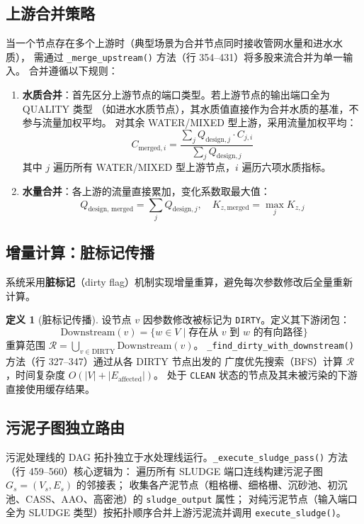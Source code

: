 \documentclass[12pt,a4paper]{ctexart}
\theoremstyle{definition}
\newtheorem{definition}{定义}[section]
\theoremstyle{remark}
\begin{document}
\subsection{上游合并策略}

当一个节点存在多个上游时（典型场景为合并节点同时接收管网水量和进水水质），
需通过 \texttt{\_merge\_upstream()} 方法（行 354--431）将多股来流合并为单一输入。
合并遵循以下规则：

\begin{enumerate}
  \item \textbf{水质合并}：首先区分上游节点的端口类型。若上游节点的输出端口全为 QUALITY 类型
        （如进水水质节点），其水质值直接作为合并水质的基准，不参与流量加权平均。
        对其余 WATER/MIXED 型上游，采用流量加权平均：
        \[
        C_{\text{merged}, i} = \frac{\sum_{j} Q_{\text{design}, j} \cdot C_{j,i}}{\sum_{j} Q_{\text{design}, j}}
        \]
        其中 $j$ 遍历所有 WATER/MIXED 型上游节点，$i$ 遍历六项水质指标。
  \item \textbf{水量合并}：各上游的流量直接累加，变化系数取最大值：
        \[
        Q_{\text{design, merged}} = \sum_j Q_{\text{design}, j}, \quad
        K_{z,\text{merged}} = \max_j K_{z,j}
        \]
\end{enumerate}

\subsection{增量计算：脏标记传播}

系统采用\textbf{脏标记}（dirty flag）机制实现增量重算，避免每次参数修改后全量重新计算。

\begin{definition}[脏标记传播]
\label{def:dirty-prop}
设节点 $v$ 因参数修改被标记为 \texttt{DIRTY}。定义其下游闭包：
\[
\text{Downstream}(v) = \{ w \in V \mid \text{存在从 } v \text{ 到 } w \text{ 的有向路径} \}
\]
重算范围 $\mathcal{R} = \bigcup_{v \in \text{DIRTY}} \text{Downstream}(v)$。
\texttt{\_find\_dirty\_with\_downstream()} 方法（行 327--347）通过从各 DIRTY 节点出发的
广度优先搜索（BFS）计算 $\mathcal{R}$，时间复杂度 $O(|V| + |E_{\text{affected}}|)$。
处于 \texttt{CLEAN} 状态的节点及其未被污染的下游直接使用缓存结果。
\end{definition}

\subsection{污泥子图独立路由}

污泥处理线的 DAG 拓扑独立于水处理线运行。\texttt{\_execute\_sludge\_pass()} 方法（行 459--560）核心逻辑为：
遍历所有 SLUDGE 端口连线构建污泥子图 $G_s = (V_s, E_s)$ 的邻接表；
收集各产泥节点（粗格栅、细格栅、沉砂池、初沉池、CASS、AAO、高密池）的 \texttt{sludge\_output} 属性；
对纯污泥节点（输入端口全为 SLUDGE 类型）按拓扑顺序合并上游污泥流并调用 \texttt{execute\_sludge()}。
\end{document}
